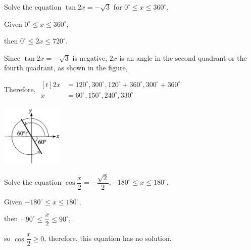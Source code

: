 \documentclass{report}
\begin{document}
\begin{question}
	Solve the equation $\tan 2 x=-\sqrt{3}$ for $0^{\circ} \leq x \leq 360^{\circ}$.
	
	\sol{}
	
	\begin{vwcol}[widths={0.6,0.4}, sep=0.8cm, justify=flush,rule=0pt]
		\noindent Given $0^{\circ} \leq x \leq 360^{\circ}$,
		    
		\noindent then $0^{\circ} \leq 2x \leq 720^{\circ}$.
		    
		\noindent Since $\tan 2x=-\sqrt{3}$ is negative, $2x$ is an angle in the second quadrant or the fourth quadrant, as shown in the figure,
		
		\noindent Therefore, $
		\begin{aligned}[t]
			2x & =120^{\circ}, 300^{\circ}, 120^{\circ}+360^{\circ}, 300^{\circ}+360^{\circ} \\
			x  & =60^{\circ}, 150^{\circ}, 240^{\circ}, 330^{\circ}                          
		\end{aligned}
		$
		
		\includegraphics[width=0.22\textwidth]{assets/11-8.jpg}
		        
	\end{vwcol}
	\vspace{-2em}
	
\end{question}

\begin{question}
	Solve the equation $\cos \dfrac{x}{2}=-\dfrac{\sqrt{2}}{2},-180^{\circ} \leq x \leq 180^{\circ}$.
	
	\sol{}
	
	\noindent Given $-180^{\circ} \leq x \leq 180^{\circ}$,
	
	\vspace{-1em}
	\noindent then $-90^{\circ} \leq \dfrac{x}{2} \leq 90^{\circ}$,
	
	\vspace{-1em}
	\noindent so $\cos \dfrac{x}{2} \geq 0$, therefore, this equation has no solution.
\end{question}

\end{document}
